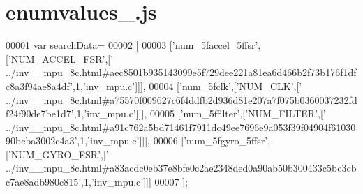 \hypertarget{enumvalues__8_8js_source}{}\section{enumvalues\+\_.\+js}
\label{enumvalues__8_8js_source}

\begin{DoxyCode}
\hypertarget{enumvalues__8_8js_source.tex_l00001}{}\hyperlink{enumvalues__8_8js_ad01a7523f103d6242ef9b0451861231e}{00001} var \hyperlink{enumvalues__8_8js_ad01a7523f103d6242ef9b0451861231e}{searchData}=
00002 [
00003   [\textcolor{stringliteral}{'num\_5faccel\_5ffsr'},[\textcolor{stringliteral}{'NUM\_ACCEL\_FSR'},[\textcolor{stringliteral}{'
      ../inv\_\_mpu\_8c.html#aec8501b935143099e5f729dee221a81ea6d466b2f73b176f1dfc8a3f94ae8a4df'},1,\textcolor{stringliteral}{'inv\_mpu.c'}]]],
00004   [\textcolor{stringliteral}{'num\_5fclk'},[\textcolor{stringliteral}{'NUM\_CLK'},[\textcolor{stringliteral}{'
      ../inv\_\_mpu\_8c.html#a75570f009627c6f4ddfb2d936d81e207a7f075b0360037232fdf24f90de7be1d7'},1,\textcolor{stringliteral}{'inv\_mpu.c'}]]],
00005   [\textcolor{stringliteral}{'num\_5ffilter'},[\textcolor{stringliteral}{'NUM\_FILTER'},[\textcolor{stringliteral}{'
      ../inv\_\_mpu\_8c.html#a91c762a5bd71461f7911dc49ee7696e9a053f39f04904f6103090bcba3002c4a3'},1,\textcolor{stringliteral}{'inv\_mpu.c'}]]],
00006   [\textcolor{stringliteral}{'num\_5fgyro\_5ffsr'},[\textcolor{stringliteral}{'NUM\_GYRO\_FSR'},[\textcolor{stringliteral}{'
      ../inv\_\_mpu\_8c.html#a83acdc0eb37e8bfe0c2ae2348ded0a90ab50b300433c5bc3cbc7ae8adb980c815'},1,\textcolor{stringliteral}{'inv\_mpu.c'}]]]
00007 ];
\end{DoxyCode}
